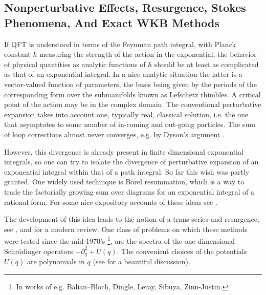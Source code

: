 \documentclass[12pt]{article}
\begin{document}
\subsection{Nonperturbative Effects, Resurgence, Stokes Phenomena, And Exact WKB Methods}

\label{subsec:nonpert}

If QFT is understood in terms of the Feynman path integral, with Planck constant $\hbar$ measuring the strength of the action in the exponential, the behavior of physical quantities as analytic functions of $\hbar$ should be at least as complicated as that of an exponential integral. In a nice analytic situation the latter is a vector-valued function of parameters, the basis
being given by the periods of the corresponding form over the submanifolds known as Lefschetz thimbles. A critical point of the action may be in the
complex domain. The conventional perturbative expansion takes into account one, typically real, classical solution, i.e. the one that
asymptotes to some number of in-coming and out-going particles. The sum of loop corrections almost never converges, e.g. by Dyson's argument \cite{Dyson:1952tj}.  

However, this divergence is already present in finite dimensional exponential integrals, so one can try to isolate the divergence of perturbative expansion of an exponential integral within that of a path integral. So far this wish was partly granted. One widely used technique is 
Borel resummation, which is a way to trade the factorially growing sum over diagrams for an exponential integral of a rational form. For some nice expository accounts of these ideas see  \cite{ArnoldGZVarchenkoV2,Marino:2012zq,Witten:2010cx}. 


 The development of this idea leads to the notion of a trans-series and resurgence, see \cite{Pham1,Pham2,MR670417,MR670418,MR852210}, and \cite{Aniceto:2018bis} for a modern review. One class of problems on which these methods were tested since the mid-1970's \footnote{In works of e.g.
 Balian–Bloch, Dingle, Leray, Sibuya, Zinn-Justin.}, are the spectra of the one-dimensional Schr{\"o}dinger operators $- {\partial}^{2}_{q} + U(q)$. The convenient choices of 
 the potentials $U(q)$ are polynomials in $q$ (see \cite{Voros}
 for a beautiful discussion).
 
\end{document}
